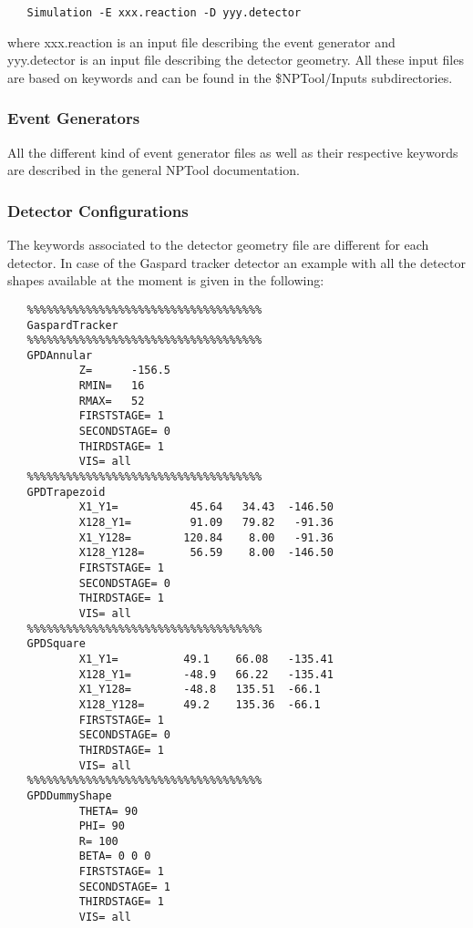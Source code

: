 \documentclass[a4paper,12pt]{article}
\begin{document}
\begin{verbatim}
   Simulation -E xxx.reaction -D yyy.detector
\end{verbatim}

where xxx.reaction is an input file describing the event generator and
yyy.detector is an input file describing the detector geometry. All these
input files are based on keywords and can be found in the \$NPTool/Inputs 
subdirectories.

\subsubsection{Event Generators}
All the different kind of event generator files as well as their 
respective keywords are described in the general NPTool documentation. 

\subsubsection{Detector Configurations}
The keywords associated to the detector geometry file are different for 
each detector. In case of the Gaspard tracker detector an example with 
all the detector shapes available at the moment is given in the following:

\begin{verbatim}
   %%%%%%%%%%%%%%%%%%%%%%%%%%%%%%%%%%%%
   GaspardTracker
   %%%%%%%%%%%%%%%%%%%%%%%%%%%%%%%%%%%%
   GPDAnnular
           Z=      -156.5
           RMIN=   16
           RMAX=   52
           FIRSTSTAGE= 1
           SECONDSTAGE= 0
           THIRDSTAGE= 1
           VIS= all
   %%%%%%%%%%%%%%%%%%%%%%%%%%%%%%%%%%%%
   GPDTrapezoid
           X1_Y1=           45.64   34.43  -146.50
           X128_Y1=         91.09   79.82   -91.36
           X1_Y128=        120.84    8.00   -91.36
           X128_Y128=       56.59    8.00  -146.50
           FIRSTSTAGE= 1
           SECONDSTAGE= 0
           THIRDSTAGE= 1
           VIS= all
   %%%%%%%%%%%%%%%%%%%%%%%%%%%%%%%%%%%%
   GPDSquare
           X1_Y1=          49.1    66.08   -135.41
           X128_Y1=        -48.9   66.22   -135.41
           X1_Y128=        -48.8   135.51  -66.1
           X128_Y128=      49.2    135.36  -66.1
           FIRSTSTAGE= 1
           SECONDSTAGE= 0
           THIRDSTAGE= 1
           VIS= all
   %%%%%%%%%%%%%%%%%%%%%%%%%%%%%%%%%%%%
   GPDDummyShape
           THETA= 90
           PHI= 90
           R= 100
           BETA= 0 0 0
           FIRSTSTAGE= 1
           SECONDSTAGE= 1
           THIRDSTAGE= 1
           VIS= all
\end{verbatim}
\end{document}
